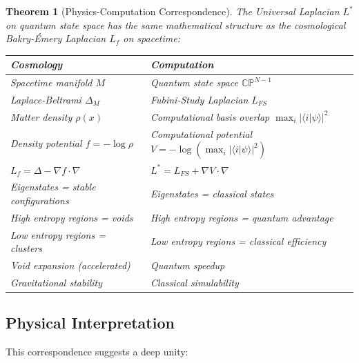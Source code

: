 \documentclass[11pt,a4paper]{article}
\theoremstyle{plain}
\newtheorem{theorem}{Theorem}[section]
\theoremstyle{definition}
\theoremstyle{remark}
\newcommand{\CP}{\mathbb{CP}}
\newcommand{\braket}[2]{\langle#1|#2\rangle}
\begin{document}
\begin{theorem}[Physics-Computation Correspondence]\label{thm:correspondence}
The Universal Laplacian $L^*$ on quantum state space has the same mathematical structure as the cosmological Bakry-\'Emery Laplacian $L_f$ on spacetime:

\begin{center}
\begin{tabular}{ll}
\toprule
\textbf{Cosmology} & \textbf{Computation} \\
\midrule
Spacetime manifold $M$ & Quantum state space $\CP^{N-1}$ \\
Laplace-Beltrami $\Delta_M$ & Fubini-Study Laplacian $L_{FS}$ \\
Matter density $\rho(x)$ & Computational basis overlap $\max_i |\braket{i}{\psi}|^2$ \\
Density potential $f = -\log \rho$ & Computational potential $V = -\log(\max_i |\braket{i}{\psi}|^2)$ \\
$L_f = \Delta - \nabla f \cdot \nabla$ & $L^* = L_{FS} + \nabla V \cdot \nabla$ \\
Eigenstates = stable configurations & Eigenstates = classical states \\
High entropy regions = voids & High entropy regions = quantum advantage \\
Low entropy regions = clusters & Low entropy regions = classical efficiency \\
Void expansion (accelerated) & Quantum speedup \\
Gravitational stability & Classical simulability \\
\bottomrule
\end{tabular}
\end{center}
\end{theorem}

\subsection{Physical Interpretation}

This correspondence suggests a deep unity:
\end{document}
